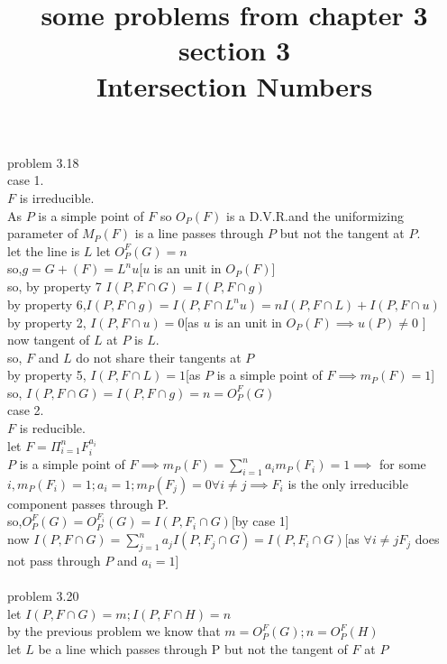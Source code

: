\documentclass[11pt]{amsart}
\theoremstyle{definition}
\begin{document}
\title{\textbf{some problems from chapter 3 section 3}\\ Intersection Numbers}
\maketitle
problem 3.18\\
case 1.\\
$F$ is irreducible.\\
As $P$ is a simple point of $F$ so $O_P(F)$ is a D.V.R.and the uniformizing parameter  of $M_P(F)$ is a line passes through $P$ but not the tangent at $P$.\\
let the line is $L$
let $O_P^F(G)=n$\\
so,$g=G+(F)=L^n u$[$u$ is an unit in $O_P(F)$]\\
so, by property 7 $I(P,F\cap G)=I(P,F\cap g)$\\
by property 6,$I(P,F\cap g)=I(P,F\cap L^n u)=n I(P,F\cap L)+I(P,F\cap u)$\\
by property 2, $I(P,F\cap u)=0$[as $u$ is an unit in $O_P(F)\implies u(P)\neq 0$ ]\\
now tangent of $L$ at $P$ is $L$.\\
so, $F$ and $L$ do not share their tangents at $P$\\
by property 5, $I(P,F\cap L)=1$[as $P$ is a simple point of $F\implies m_P(F)=1$]\\
so, $I(P,F\cap G)=I(P,F\cap g)=n=O_P^F(G)$\\
case 2.\\
$F$ is reducible.\\
let $F=\Pi_{i=1}^n F_i^{a_i}$\\
$P$ is a simple point of $F\implies m_P(F)=\sum_{i=1}^n a_i m_P(F_i)=1\implies$ for some $i,m_P(F_i)=1;a_i=1;m_P(F_j)=0\forall i\neq j\implies F_i$ is the only irreducible component passes through P.\\
so,$ O_P^F(G)=O_P^{F_i}(G)=I(P,F_i\cap G)$[by case 1]\\
now $I(P,F\cap G)=\sum_{j=1}^n a_j I(P,F_j\cap G)=I(P,F_i\cap G)$[as $\forall i\neq j F_j$ does not pass through $P$ and $a_i=1$]\\\\
problem 3.20\\
let $I(P,F\cap G)=m;I(P,F\cap H)=n$\\
by the previous problem we know that $m=O_P^F(G);n=O_P^F(H)$\\
let $L$ be a line which passes through P but not the tangent of $F$ at $P$\\
\end{document}
